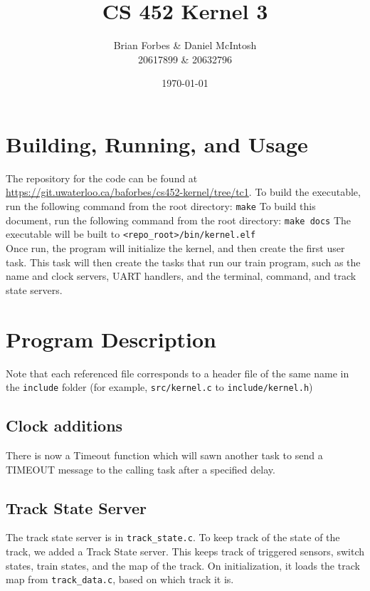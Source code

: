 \documentclass{article}
\begin{document}
\title{CS 452 Kernel 3}
\author{Brian Forbes \& Daniel McIntosh \\ 20617899 \& 20632796}
\date{\today}

\maketitle

\section{ Building, Running, and Usage }

The repository for the code can be found at \url{https://git.uwaterloo.ca/baforbes/cs452-kernel/tree/tc1}.
To build the executable, run the following command from the root directory: \verb|make|
To build this document, run the following command from the root directory: \verb|make docs|
The executable will be built to \verb|<repo_root>/bin/kernel.elf|\\

Once run, the program will initialize the kernel, and then create the first user task. This task will then create the tasks that run our train program, such as the name and clock servers, UART handlers, and the terminal, command, and track state servers.

\section{Program Description}
Note that each referenced file corresponds to a header file of the same name in the \verb|include| folder (for example, \verb|src/kernel.c| to \verb|include/kernel.h|)

\subsection{ Clock additions}
There is now a Timeout function which will sawn another task to send a TIMEOUT message to the calling task after a specified delay.

\subsection{ Track State Server}
The track state server is in \verb|track_state.c|.
To keep track of the state of the track, we added a Track State server. This keeps track of triggered sensors, switch states, train states, and the map of the track. 
On initialization, it loads the track map from \verb|track_data.c|, based on which track it is.
\end{document}

